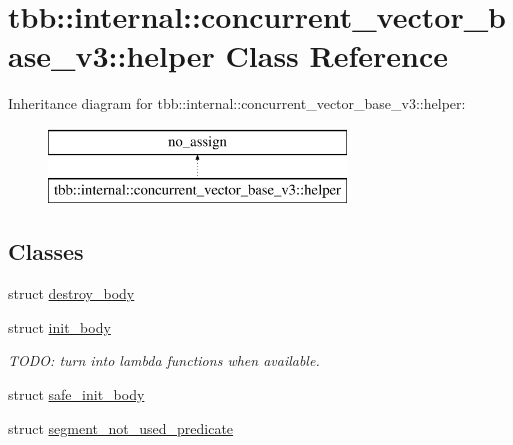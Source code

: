 \hypertarget{classtbb_1_1internal_1_1concurrent__vector__base__v3_1_1helper}{}\section{tbb\+:\+:internal\+:\+:concurrent\+\_\+vector\+\_\+base\+\_\+v3\+:\+:helper Class Reference}
\label{classtbb_1_1internal_1_1concurrent__vector__base__v3_1_1helper}
Inheritance diagram for tbb\+:\+:internal\+:\+:concurrent\+\_\+vector\+\_\+base\+\_\+v3\+:\+:helper\+:\begin{figure}[H]
\begin{center}
\leavevmode
\includegraphics[height=2.000000cm]{classtbb_1_1internal_1_1concurrent__vector__base__v3_1_1helper}
\end{center}
\end{figure}
\subsection*{Classes}
\begin{DoxyCompactItemize}
\item 
struct \hyperlink{structtbb_1_1internal_1_1concurrent__vector__base__v3_1_1helper_1_1destroy__body}{destroy\+\_\+body}
\item 
struct \hyperlink{structtbb_1_1internal_1_1concurrent__vector__base__v3_1_1helper_1_1init__body}{init\+\_\+body}
\begin{DoxyCompactList}\small\item\em T\+O\+D\+O\+: turn into lambda functions when available. \end{DoxyCompactList}\item 
struct \hyperlink{structtbb_1_1internal_1_1concurrent__vector__base__v3_1_1helper_1_1safe__init__body}{safe\+\_\+init\+\_\+body}
\item 
struct \hyperlink{structtbb_1_1internal_1_1concurrent__vector__base__v3_1_1helper_1_1segment__not__used__predicate}{segment\+\_\+not\+\_\+used\+\_\+predicate}
\end{DoxyCompactItemize}
